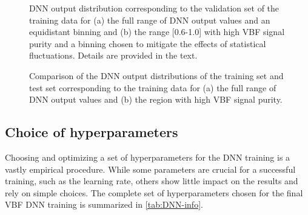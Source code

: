 \captionsetup[subfloat]{captionskip=7pt} %
\begin{figure}[ht]
    \caption{DNN output distribution corresponding to the validation set of the training data for (a) the full range of DNN output values and an equidistant binning and (b) the range [0.6-1.0] with high VBF signal purity and a binning chosen to mitigate the effects of statistical fluctuations. Details are provided in the text.}
    \label{fig:dnn-val-set}
\end{figure}


\begin{figure}[t]
    \caption{Comparison of the DNN output distributions of the training set and test set corresponding to the training data for (a) the full range of DNN output values and (b) the region with high VBF signal purity.}
    \label{fig:dnn-train-vs-test}
\end{figure}


\subsection{Choice of hyperparameters}
\label{subsec:hyper-parameters}
Choosing and optimizing a set of hyperparameters for the DNN training is a vastly empirical procedure.
While some parameters are crucial for a successful training, such as the learning rate, others show little impact on the results and rely on simple choices.
The complete set of hyperparameters chosen for the final VBF DNN training is summarized in \cref{tab:DNN-info}.

